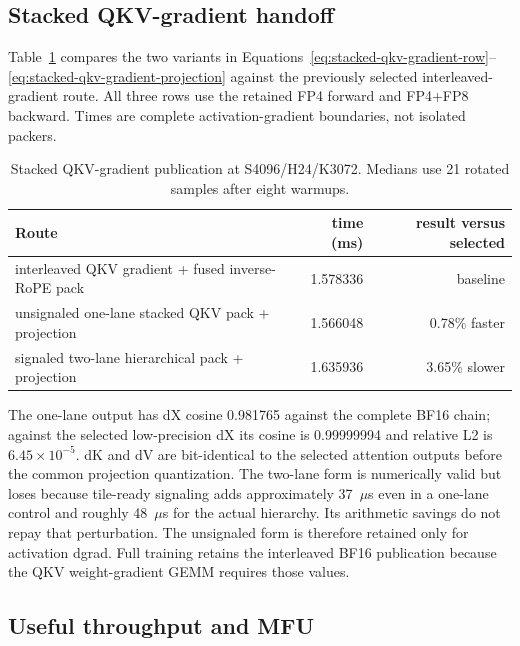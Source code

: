 \subsection{Stacked QKV-gradient handoff}

Table~\ref{tab:stacked-qkv-handoff} compares the two variants in
Equations~\ref{eq:stacked-qkv-gradient-row}--\ref{eq:stacked-qkv-gradient-projection}
against the previously selected interleaved-gradient route.  All three rows
use the retained FP4 forward and FP4+FP8 backward.  Times are complete
activation-gradient boundaries, not isolated packers.

\begin{table}[htbp]
\centering
\caption{Stacked QKV-gradient publication at S4096/H24/K3072.  Medians use
21 rotated samples after eight warmups.}
\label{tab:stacked-qkv-handoff}
\small
\begin{tabular}{l rr}
\toprule
Route & time (ms) & result versus selected \\
\midrule
interleaved QKV gradient + fused inverse-RoPE pack & 1.578336 & baseline \\
unsignaled one-lane stacked QKV pack + projection & 1.566048 & 0.78\% faster \\
signaled two-lane hierarchical pack + projection & 1.635936 & 3.65\% slower \\
\bottomrule
\end{tabular}
\end{table}

The one-lane output has dX cosine 0.981765 against the complete BF16 chain;
against the selected low-precision dX its cosine is 0.99999994 and relative
L2 is $6.45\times10^{-5}$.  dK and dV are bit-identical to the selected
attention outputs before the common projection quantization.  The two-lane
form is numerically valid but loses because tile-ready signaling adds
approximately 37~$\mu$s even in a one-lane control and roughly 48~$\mu$s for
the actual hierarchy.  Its arithmetic savings do not repay that perturbation.
The unsignaled form is therefore retained only for activation dgrad.  Full
training retains the interleaved BF16 publication because the QKV
weight-gradient GEMM requires those values.

\subsection{Useful throughput and MFU}

